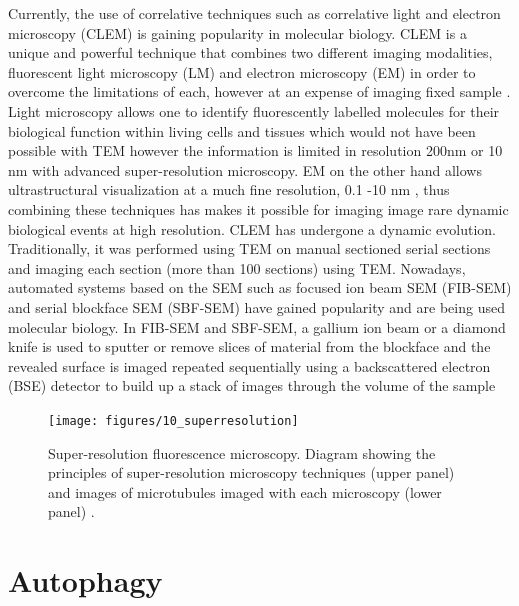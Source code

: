 Currently, the use of correlative techniques such as correlative light and electron microscopy (CLEM) is gaining popularity in molecular biology. CLEM is a unique and powerful technique that combines two different imaging modalities, fluorescent light microscopy (LM) and electron microscopy (EM) in order to overcome the limitations of each, however at an expense of imaging fixed sample \citep{Russell2017}. Light microscopy allows one to identify fluorescently labelled molecules for their biological function within living cells and tissues which would not have been possible with TEM however the information is limited in resolution 200nm or 10 nm with advanced super-resolution microscopy.  EM on the other hand allows ultrastructural visualization at a much fine resolution, 0.1 -10 nm \citep{Feng2018}, thus combining these techniques has makes it possible for imaging image  rare dynamic biological events at high resolution. CLEM has undergone a dynamic evolution. Traditionally, it was performed using TEM on manual sectioned serial sections and imaging each section (more than 100 sections) using TEM. Nowadays, automated systems  based on the SEM such as focused ion beam SEM (FIB-SEM) \citep{Heymann2006} and serial blockface SEM (SBF-SEM) \citep{Denk2004} have gained popularity and are being used molecular biology. In FIB-SEM and SBF-SEM, a gallium ion beam  or a diamond knife is used to sputter or remove slices of material from the blockface and the revealed surface is imaged repeated sequentially using a backscattered electron (BSE) detector to build up a stack of images through the volume of the sample \citep{Russell2017}

\begin{figure}[!htbp]
  \texttt{[image: figures/10\_superresolution]}
  \caption{Super-resolution fluorescence microscopy. Diagram showing the principles of super-resolution microscopy techniques (upper panel) and images  of microtubules imaged with each microscopy (lower panel) \citep{Feng2018}.}
  \label{fig:10_superresolution}
\end{figure}

\section{Autophagy}
